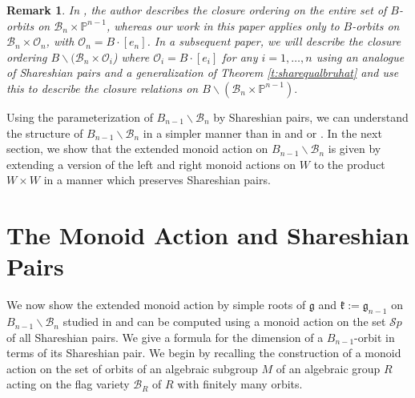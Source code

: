 \documentclass[12pt]{amsart}
\numberwithin{equation}{section}
\newtheorem{rem}[thm]{Remark}
\newcommand{\fk}{\mbox{${\mathfrak k}$}}
\newcommand{\fg}{\mbox{${\mathfrak g}$}}
\newcommand{\B}{\mathcal{B}}
\newcommand{\Borbitspace}{B_{n-1}\backslash\B_{n}}
\newcommand{\calO}{\mathcal{O}}
\newcommand{\Sp}{\mathcal{S}p}
\begin{document}
\begin{rem}\label{r:Magyarmore}
In \cite{Magyar}, the author describes the closure ordering on the entire set 
of $B$-orbits on $\B_{n}\times\mathbb{P}^{n-1}$, whereas our work in this paper applies only to $B$-orbits on $\B_{n}\times\calO_{n}$, with $\calO_{n}=B\cdot [e_{n}]$.  In a subsequent paper, we will describe the closure ordering $B\backslash (\B_{n}\times \mathcal{O}_{i}$) where $\mathcal{O}_{i}=B\cdot[e_{i}]$ for any $i=1,\dots, n$ using an analogue of Shareshian pairs and a generalization of Theorem \ref{t:sharequalbruhat} and use this to describe the closure relations on $B\backslash (\B_{n}\times\mathbb{P}^{n-1}).$  

\end{rem}


Using the parameterization of $\Borbitspace$ by Shareshian pairs, we can understand the structure of $\Borbitspace$ in a simpler manner than in \cite{CE21I} and \cite{CE21II} or \cite{Magyar}.  In the next section, we show that the extended monoid action on $\Borbitspace$ is given by extending a version of the left and right monoid actions on $W$ to the product $W\times W$ in a manner which preserves Shareshian pairs.  






\section{The Monoid Action and Shareshian Pairs}\label{s:monoid}


We now show the extended monoid action by simple roots of $\fg$ and $\fk:=\fg_{n-1}$ on $\Borbitspace$ studied in \cite{CE21I} and \cite{CE21II} can be computed using a monoid action on the set $\Sp$ of all Shareshian pairs.  We give a formula for the dimension of a $B_{n-1}$-orbit in terms of its Shareshian pair.  We begin by recalling the construction of a monoid action on the set of orbits of an algebraic subgroup $M$ of an algebraic group $R$ acting on the flag variety $\B_{R}$ of $R$  with finitely many orbits.  
\end{document}
